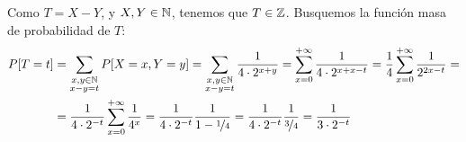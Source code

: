 \begin{ejercicio}
\begin{enumerate}
        Como $T=X-Y$, y $X,Y\in\mathbb{N}$, tenemos que $T\in\mathbb{Z}$. Busquemos la función masa de probabilidad de $T$:
        \begin{align*}
            P[T=t]&=\sum_{\substack{x,y\in\mathbb{N} \\ x-y=t}} P[X=x,Y=y]
            = \sum_{\substack{x,y\in\mathbb{N} \\ x-y=t}} \dfrac{1}{4\cdot 2^{x+y}}
            = \sum_{x=0}^{+\infty}\dfrac{1}{4\cdot 2^{x+x-t}}
            = \dfrac{1}{4}\sum_{x=0}^{+\infty}\dfrac{1}{2^{2x-t}}
            =\\&= \dfrac{1}{4\cdot 2^{-t}}\sum_{x=0}^{+\infty}\dfrac{1}{4^x}
            = \dfrac{1}{4\cdot 2^{-t}}\dfrac{1}{1-\nicefrac{1}{4}}
            = \dfrac{1}{4\cdot 2^{-t}}\dfrac{1}{\nicefrac{3}{4}}
            = \dfrac{1}{3\cdot 2^{-t}}
        \end{align*}
    \end{enumerate}
\end{ejercicio}

